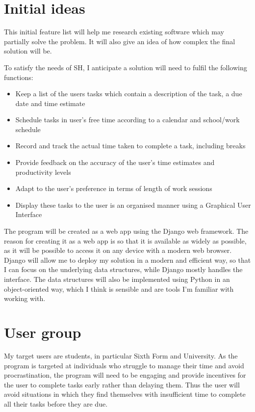 \documentclass{article}
\begin{document}
\section{Initial ideas}
This initial feature list will help me research existing software which may
partially solve the problem. It will also give an idea of how complex the final
solution will be.

To satisfy the needs of SH, I anticipate a solution will need to fulfil the
following functions:

\begin{itemize}
\item Keep a list of the users tasks which contain a description of the task, a
  due date and time estimate
\item Schedule tasks in user's free time according to a calendar and school/work
  schedule
\item Record and track the actual time taken to complete a task, including
  breaks
\item Provide feedback on the accuracy of the user's time estimates and
  productivity levels
\item Adapt to the user's preference in terms of length of work sessions
\item Display these tasks to the user is an organised manner using a Graphical
  User Interface
\end{itemize}

The program will be created as a web app using the Django web framework. The
reason for creating it as a web app is so that it is available as widely as
possible, as it will be possible to access it on any device with a modern web
browser. Django will allow me to deploy my solution in a modern and efficient
way, so that I can focus on the underlying data structures, while Django mostly
handles the interface. The data structures will also be implemented using Python
in an object-oriented way, which I think is sensible and are tools I'm familiar
with working with.

\section{User group}
My target users are students, in particular Sixth Form and University. As the
program is targeted at individuals who struggle to manage their time and avoid
procrastination, the program will need to be engaging and provide incentives for
the user to complete tasks early rather than delaying them. Thus the user will
avoid situations in which they find themselves with insufficient time to
complete all their tasks before they are due.
\end{document}
